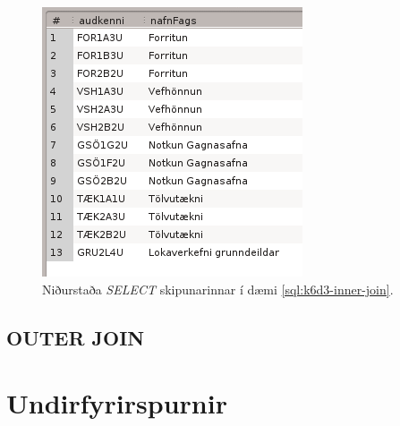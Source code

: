 \begin{example}
\caption[INNER JOIN]{\emph{SELECT} skipun sem velur úr töflunum \emph{Fog} og \emph{Afangar}. Niðurstöðurnar má sjá á mynd \ref{mynd:nidurstada-join}.}
\label{sql:k6d3-inner-join}
\centering
{}
\end{example}

\begin{figure}
\caption[INNER JOIN niðurstaða]{Niðurstaða \emph{SELECT} skipunarinnar í dæmi \ref{sql:k6d3-inner-join}. }
\label{mynd:nidurstada-join}
\centering
\includegraphics{myndir/workbench-nidurstada-join}
\end{figure}

\subsection{OUTER JOIN}
\section{Undirfyrirspurnir}
\label{undirkafli:undirfyrirspurnir}





